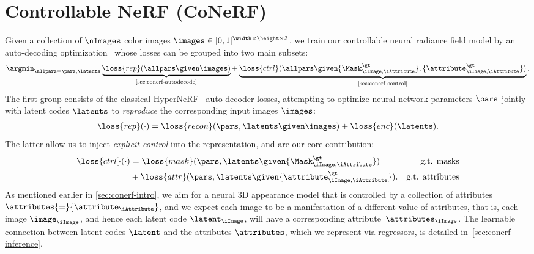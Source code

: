 
\section{Controllable NeRF (CoNeRF)}
  Given a collection of $\nImages$ color images $\images \in [0,1]^{\width \times \height \times 3}$, we train our controllable neural radiance field model by an auto-decoding optimization~\cite{park2019deepsdf} whose losses can be grouped into two main subsets:
  \begin{align}
    \argmin_{\allpars=\pars, \latents}
    \underbrace{\loss{rep}(\allpars \given \images)}_\text{\cref{sec:conerf-autodecode}}{+}
    \underbrace{\loss{ctrl}(\allpars \given
      \{\Mask^\gt_{\iImage, \iAttribute} \}, \{\attribute^\gt_{\iImage,\iAttribute}\} )}_\text{\cref{sec:conerf-control}}
    .
  \end{align}
  The first group consists of the classical HyperNeRF~\cite{park2021hypernerf} auto-decoder losses, attempting to optimize neural network parameters $\pars$ jointly with latent codes $\latents$ to \textit{reproduce} the corresponding input images $\images$:
  \begin{align}
    \loss{rep}(\cdot) =
    \loss{recon}(\pars, \latents \given \images) +
    \loss{enc}(\latents)
    .
    \label{eq:conerf-loss_render}
  \end{align}
  The latter allow us to inject \textit{explicit control} into the representation, and are our core contribution:
  \begin{align}
    \loss{ctrl}(\cdot)
     & = \loss{mask}(\pars, \latents \given \{\Mask^\gt_{\iImage, \iAttribute} \})     & \text{g.t. masks}      \\
     & + \loss{attr}(\pars, \latents \given \{\attribute^\gt_{\iImage,\iAttribute}\}). & \text{g.t. attributes}
    \label{eq:loss_control}
  \end{align}
  As mentioned earlier in \cref{sec:conerf-intro}, we aim for a neural 3D
  appearance model that is controlled by a collection of attributes $\attributes
    {=} \{\attribute_\iAttribute\}$, and we expect each image to be a
  manifestation of a different value of attributes, that is, each image
  $\image_\iImage$, and hence each latent code $\latent_\iImage$, will have a
  corresponding attribute~$\attributes_\iImage$.
  The learnable connection between latent codes $\latent$ and the attributes
  $\attributes$, which we represent via regressors, is detailed
  in~\cref{sec:conerf-inference}.

